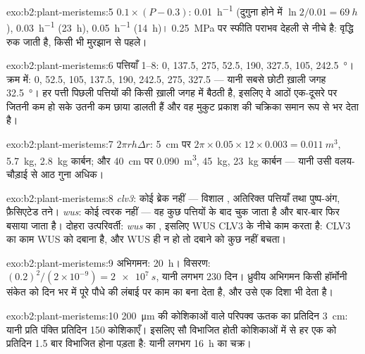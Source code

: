 \begin{solution}{exo:b2:plant-meristems:5}
$0.1\times(P - 0.3)$: \qty{0.01}{h^{-1}} (दुगुना होने में $\ln 2/0.01 =
\qty{69}{h}$), \qty{0.03}{h^{-1}} (\qty{23}{h}), \qty{0.05}{h^{-1}}
(\qty{14}{h})। \qty{0.25}{MPa} पर स्फीति पराभव देहली से
नीचे है: वृद्धि रुक जाती है, किसी भी मुरझान से पहले।
\end{solution}

\begin{solution}{exo:b2:plant-meristems:6}
पत्तियाँ 1--8: 0, 137.5, 275, 52.5, 190, 327.5, 105, \qty{242.5}{\degree}।
क्रम में: 0, 52.5, 105, 137.5, 190, 242.5, 275, 327.5 --- यानी सबसे छोटी
ख़ाली जगह \qty{32.5}{\degree}। हर पत्ती पिछली पत्तियों की किसी ख़ाली जगह
में बैठती है, इसलिए वे आठों एक-दूसरे पर जितनी कम हो सके उतनी कम छाया
डालती हैं और वह मुकुट प्रकाश की चक्रिका समान रूप से भर देता है।
\end{solution}

\begin{solution}{exo:b2:plant-meristems:7}
$2\pi r h\Delta r$: \qty{5}{cm} पर $2\pi\times 0.05\times 12\times
0.003 = \qty{0.011}{m^3}$, \qty{5.7}{kg}, \qty{2.8}{kg} कार्बन; और
\qty{40}{cm} पर \qty{0.090}{m^3}, \qty{45}{kg}, \qty{23}{kg} कार्बन
--- यानी उसी वलय-चौड़ाई से आठ गुना अधिक।
\end{solution}

\begin{solution}{exo:b2:plant-meristems:8}
\emph{clv3}: कोई ब्रेक नहीं --- विशाल , अतिरिक्त पत्तियाँ तथा
पुष्प-अंग, फ़ैसिएटेड तने। \emph{wus}: कोई त्वरक नहीं --- वह 
कुछ पत्तियों के बाद चुक जाता है और बार-बार फिर बसाया जाता है। दोहरा
उत्परिवर्ती: \emph{wus} का , इसलिए WUS CLV3 के नीचे काम करता है:
CLV3 का काम WUS को दबाना है, और WUS ही न हो तो दबाने को कुछ नहीं बचता।
\end{solution}

\begin{solution}{exo:b2:plant-meristems:9}
अभिगमन: \qty{20}{h}। विसरण: $(0.2)^{2}/(2\times 10^{-9}) =
\qty{2e7}{s}$, यानी लगभग 230 दिन। ध्रुवीय अभिगमन किसी हॉर्मोनी
संकेत को दिन भर में पूरे पौधे की लंबाई पर काम का बना देता है, और उसे
एक दिशा भी देता है।
\end{solution}

\begin{solution}{exo:b2:plant-meristems:10}
\qty{200}{\micro m} की कोशिकाओं वाले परिपक्व ऊतक का प्रतिदिन \qty{3}{cm}:
यानी प्रति पंक्ति प्रतिदिन \num{150} कोशिकाएँ। इसलिए सौ विभाजित होती
कोशिकाओं में से हर एक को प्रतिदिन 1.5 बार विभाजित होना पड़ता है: यानी लगभग \qty{16}{h} का चक्र।
\end{solution}

